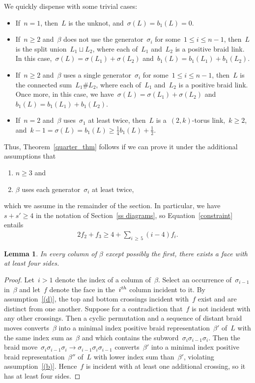\documentclass[10pt,a4paper]{amsart}
\numberwithin{equation}{section}
\newcommand*{\alphenumi}{\renewcommand*{\theenumi}{\alph{enumi}}}
\newtheorem{lemm}[theo]{Lemma}
\begin{document}
We quickly dispense with some trivial cases:
\begin{itemize}
\item If~$n=1$, then~$L$ is the unknot, and~$\sigma(L) = b_1(L) = 0$.
\item If~$n \ge 2$ and~$\beta$ does not use the generator~$\sigma_i$ for some~$1 \le i \le n-1$, then~$L$ is the split union~$L_1 \sqcup L_2$, where each of~$L_1$ and~$L_2$ is a positive braid link. In this case,~$\sigma(L) = \sigma(L_1) + \sigma(L_2)$ and~$b_1(L) = b_1(L_1) + b_1(L_2)$.
\item If~$n \ge 2$ and~$\beta$ uses a single generator~$\sigma_i$ for some~$1 \le i \le n-1$, then~$L$ is the connected sum~$L_1 \# L_2$, where each of~$L_1$ and~$L_2$ is a positive braid link. Once more, in this case, we have~$\sigma(L) = \sigma(L_1) + \sigma(L_2)$ and~$b_1(L) = b_1(L_1) + b_1(L_2)$.
\item If~$n=2$ and~$\beta$ uses~$\sigma_1$ at least twice, then~$L$ is a~$(2,k)$-torus link,~$k \ge 2$, and~$k-1 = \sigma(L) = b_1(L) \ge \frac14 b_1(L) + \frac12$.
\end{itemize}
Thus, Theorem~\ref{quarter_thm} follows if we can prove it under the additional assumptions that
\begin{enumerate}\alphenumi
\setcounter{enumi}{2}
\item\label{(c)} $n \ge 3$ and
\item\label{(d)} $\beta$ uses each generator~$\sigma_i$ at least twice,
\end{enumerate}
which we assume in the remainder of the section. In particular, we have~$s+s' \ge 4$ in the notation of Section~\ref{ss diagrams}, so Equation~\eqref{constraint} entails
\begin{align}\label{constraint2}
2f_2 + f_3 \ge 4 + \sum_{i\,\ge\,5}(i-4)f_i.
\end{align}

\begin{lemm}\label{face_lemma}
In every column of $\beta$ except possibly the first, there exists a face with at least four sides.
\end{lemm}

\begin{proof}
Let~$i > 1$ denote the index of a column of~$\beta$. Select an occurrence of~$\sigma_{i-1}$ in~$\beta$ and let~$f$ denote the face in the~$i^{\rm th}$ column incident to it. By assumption~\eqref{(d)}, the top and bottom crossings incident with~$f$ exist and are distinct from one another. Suppose for a contradiction that~$f$ is not incident with any other crossings. Then a cyclic permutation and a sequence of distant braid moves converts~$\beta$ into a minimal index positive braid representation~$\beta'$ of~$L$ with the same index sum as~$\beta$ and which contains the subword~$\sigma_{i}\sigma_{i-1}\sigma_{i}$. Then the braid move~$\sigma_{i}\sigma_{i-1}\sigma_{i}\to\sigma_{i-1}\sigma_{i}\sigma_{i-1}$ converts~$\beta'$ into a minimal index positive braid representation~$\beta''$ of~$L$ with lower index sum than~$\beta'$, violating assumption~\eqref{(b)}. Hence~$f$ is incident with at least one additional crossing, so it has at least four sides.
\end{proof}
\end{document}
